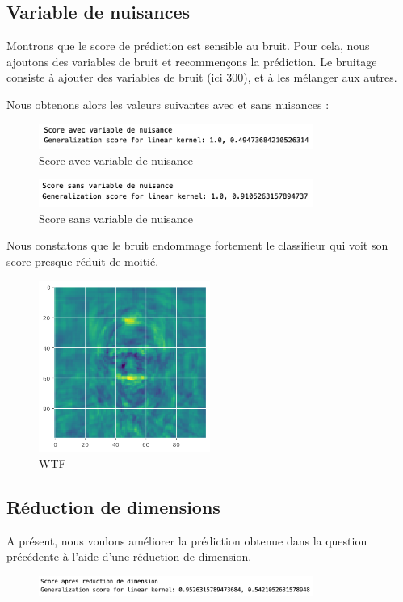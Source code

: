 \documentclass[a4paper,12pt]{article}
\begin{document}
\subsection{Variable de nuisances}

Montrons que le score de prédiction est sensible au bruit. Pour cela, nous ajoutons des variables de bruit et
recommençons la prédiction. Le bruitage consiste à ajouter des variables de bruit (ici 300), et à les mélanger aux autres. 

Nous obtenons alors les valeurs suivantes avec et sans nuisances :

\begin{figure}[H]
    \centering
    \includegraphics[width=0.8\textwidth]{Images/avec_variable.png}
    \caption{Score avec variable de nuisance}\label{fig: avec}
\end{figure}

\begin{figure}[H]
    \centering
    \includegraphics[width=0.8\textwidth]{Images/sans_variable.png}
    \caption{Score sans variable de nuisance}\label{fig: sans}
\end{figure}

Nous constatons que le bruit endommage fortement le classifieur qui voit son score presque réduit de moitié.

\begin{figure}[H]
    \centering
    \includegraphics[width=0.5\textwidth]{Images/coeff_visage.png}
    \caption{WTF}\label{fig:?}
\end{figure}

\subsection{Réduction de dimensions}

A présent, nous voulons améliorer la prédiction obtenue dans la question précédente à l'aide d'une réduction de
dimension.
\begin{figure}[H]
    \centering
    \includegraphics[width=0.8\textwidth]{Images/apres_reduction.png}
    \caption{}\label{fig:dim}
\end{figure}
\end{document}
